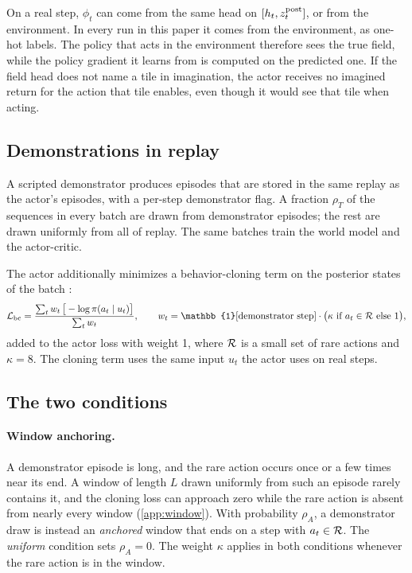 On a real step, $\phi_t$ can come from the same head on $[h_t, z^{\mathrm{post}}_t]$, or from the environment.
In every run in this paper it comes from the environment, as one-hot labels.
The policy that acts in the environment therefore sees the true field, while the policy gradient it learns from is computed on the predicted one.
If the field head does not name a tile in imagination, the actor receives no imagined return for the action that tile enables, even though it would see that tile when acting.

\subsection{Demonstrations in replay}
\label{sec:method-demos}

A scripted demonstrator produces episodes that are stored in the same replay as the actor's episodes, with a per-step demonstrator flag.
A fraction $\rho_T$ of the sequences in every batch are drawn from demonstrator episodes; the rest are drawn uniformly from all of replay.
The same batches train the world model and the actor-critic.

The actor additionally minimizes a behavior-cloning term on the posterior states of the batch \citep{pomerleau1988alvinn}:
\begin{equation}
  \mathcal{L}_{\mathrm{bc}} = \frac{\sum_{t} w_t \, \big[-\log \pi(a_t \mid u_t)\big]}{\sum_t w_t},
  \qquad
  w_t = \mathbb{1}[\text{demonstrator step}] \cdot \big(\kappa \text{ if } a_t \in \rareset \text{ else } 1\big),
\end{equation}
added to the actor loss with weight 1, where $\mathcal{R}$ is a small set of rare actions and $\kappa=8$.
The cloning term uses the same input $u_t$ the actor uses on real steps.

\subsection{The two conditions}
\label{sec:method-switches}

\paragraph{Window anchoring.}
A demonstrator episode is long, and the rare action occurs once or a few times near its end.
A window of length $L$ drawn uniformly from such an episode rarely contains it, and the cloning loss can approach zero while the rare action is absent from nearly every window (\cref{app:window}).
With probability $\rho_A$, a demonstrator draw is instead an \emph{anchored} window that ends on a step with $a_t\in\mathcal{R}$.
The \emph{uniform} condition sets $\rho_A=0$.
The weight $\kappa$ applies in both conditions whenever the rare action is in the window.

